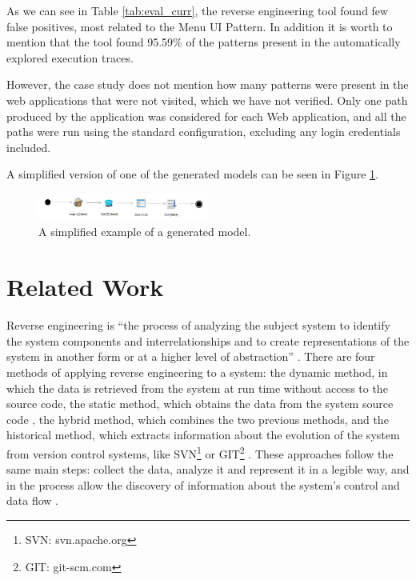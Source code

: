 \documentclass[conference]{IEEEtran}
\begin{document}
As we can see in Table \ref{tab:eval_curr}, the reverse engineering tool found few false positives, most related to the Menu UI Pattern. In addition it is worth to mention that the tool found 95.59\% of the  patterns present in the automatically explored execution traces.

However, the case study does not mention how many patterns were present in the web applications that were not visited, which we have not verified. Only one path produced by the application was considered for each Web application, and all the paths were run using the standard configuration, excluding any login credentials included.

A simplified version of one of the generated models can be seen in Figure \ref{fig:pbgt-me}.

\begin{figure}[!htb]
\centering
\includegraphics[width=0.5\textwidth]{pbgt-me.png}
\caption{A simplified example of a generated model.}
\label{fig:pbgt-me}
\end{figure}

\section{Related Work}\label{sec:sota}

Reverse engineering is ``the process of analyzing the subject system to identify the system components and interrelationships and to create representations of the system in another form or at a higher level of abstraction'' \cite{chikofsky1990reverse}. There are four methods of applying reverse engineering to a system: the dynamic method, in which the data is retrieved from the system at run time without access to the source code, the static method, which obtains the data from the system source code \cite{systa1999dynamic}, the hybrid method, which combines the two previous methods, and the historical method, which extracts information about the evolution of the system
from version control systems, like SVN\footnote{SVN: svn.apache.org} or GIT\footnote{GIT: git-scm.com} \cite{canfora2011achievements}. These approaches follow the same main steps: collect the data, analyze it and represent it in a legible way, and in the process allow the discovery of information about the system's control and data flow \cite{pacione2003comparative}.
\end{document}
